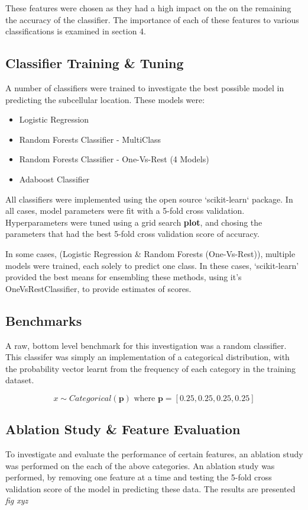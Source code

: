 \documentclass{bioinfo}
\begin{document}
These features were chosen as they had a high impact on the on the remaining the accuracy of the classifier. The importance of each of these features to various classifications is examined in section 4.  


\subsection{Classifier Training \& Tuning}

A number of classifiers were trained to investigate the best possible model in predicting the subcellular location. These models were:

\begin{itemize}
  \item {Logistic Regression}
  \item {Random Forests Classifier - MultiClass}
  \item {Random Forests Classifier - One-Vs-Rest (4 Models)}
  \item {Adaboost Classifier}
\end{itemize}

All classifiers were implemented using the open source `scikit-learn` package. In all cases, model parameters were fit with a 5-fold cross validation. Hyperparameters were tuned using a grid search \textbf{plot}, and chosing the parameters that had the best 5-fold cross validation score of accuracy. 

In some cases, (Logistic Regression \& Random Forests (One-Vs-Rest)), multiple models were trained, each solely to predict one class. In these cases, `scikit-learn' provided the best means for ensembling these methods, using it's OneVsRestClassifier, to provide estimates of scores. 

\subsection{Benchmarks}

A raw, bottom level benchmark for this investigation was a random classifier. This classifer was simply an implementation of a categorical distribution, with the probability vector learnt from the frequency of each category in the training dataset.

$$x \sim Categorical(\mathbf{p}) \text{ where } \mathbf{p} = [0.25, 0.25, 0.25, 0.25]$$


\subsection{Ablation Study \& Feature Evaluation }
To investigate and evaluate the performance of certain features, an ablation study was performed on the each of the above categories.
An ablation study was performed, by removing one feature at a time and testing the 5-fold cross validation score of the model in predicting these data. 
The results are presented \textit{fig xyz}
\end{document}
